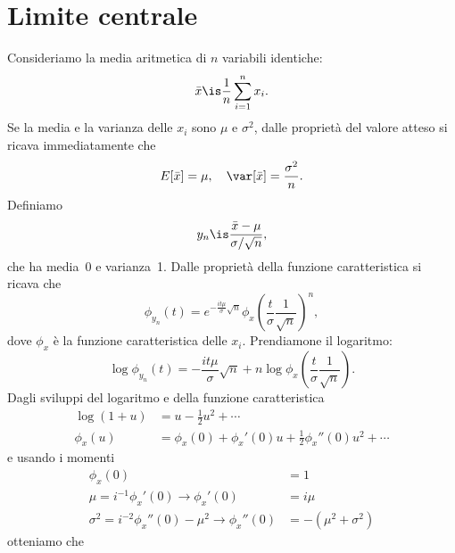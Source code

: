 
\section{Limite centrale}

Consideriamo la media aritmetica di $n$ variabili identiche:
\begin{equation*}
	\bar x \is \frac1n \sum_{i=1}^n x_i.
\end{equation*}
Se la media e la varianza delle $x_i$ sono $\mu$ e $\sigma^2$,
dalle proprietà del valore atteso si ricava immediatamente che
\begin{equation*}
	E[\bar x] = \mu, \quad \var[\bar x] = \frac{\sigma^2}{n}.
\end{equation*}
Definiamo
\begin{equation*}
	y_n \is \frac{\bar x - \mu}{\sigma / \sqrt n},
\end{equation*}
che ha media~0 e varianza~1.
Dalle proprietà della funzione caratteristica si ricava che
\begin{equation*}
	\phi_{y_n}(t) = e^{-\frac{it\mu}{\sigma}\sqrt n} \phi_x\left(\frac t\sigma \frac1{\sqrt n}\right)^n,
\end{equation*}
dove $\phi_x$ è la funzione caratteristica delle $x_i$. Prendiamone il logaritmo:
\begin{equation*}
	\log\phi_{y_n}(t) = -\frac{it\mu}{\sigma}\sqrt n + n\log\phi_x\left(\frac t\sigma \frac1{\sqrt n}\right).
\end{equation*}
Dagli sviluppi del logaritmo e della funzione caratteristica
\begin{align*}
	\log(1+u) &= u - \frac12 u^2 + \dotsb \\
	\phi_x(u) &= \phi_x(0) + \phi_x'(0)u + \frac12 \phi_x''(0) u^2 + \dotsb
\end{align*}
e usando i momenti
\begin{align*}
	\phi_x(0) &= 1 \\
	\mu = i^{-1}\phi_x'(0) \rightarrow \phi_x'(0) &= i\mu \\
	\sigma^2 = i^{-2}\phi_x''(0) - \mu^2 \rightarrow \phi_x''(0) &= -(\mu^2+\sigma^2)
\end{align*}
otteniamo che
